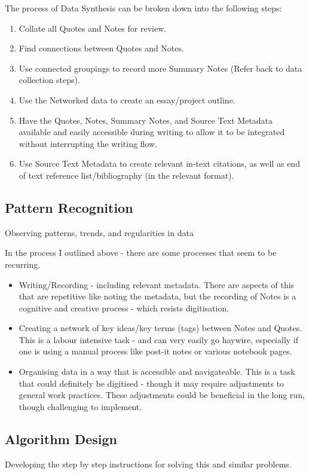 \documentclass{article}
\begin{document}
The process of Data Synthesis can be broken down into the following steps:
\begin{enumerate}
    \item Collate all Quotes and Notes for review.
    \item Find connections between Quotes and Notes.
    \item Use connected groupings to record more Summary Notes (Refer back to data collection steps).
    \item Use the Networked data to create an essay/project outline.
    \item Have the Quotes, Notes, Summary Notes, and Source Text Metadata available and easily accessible during writing to allow it to be integrated without interrupting the writing flow. 
    \item Use Source Text Metadata to create relevant in-text citations, as well as end of text reference list/bibliography (in the relevant format).
\end{enumerate}

\subsection{Pattern Recognition}
Observing patterns, trends, and regularities in data

In the process I outlined above - there are some processes that seem to be recurring. 

\begin{itemize}
    \item Writing/Recording - including relevant metadata. There are aspects of this that are repetitive like noting the metadata, but the recording of Notes is a cognitive and creative process - which resists digitisation. 
    \item Creating a network of key ideas/key terms (tags) between Notes and Quotes. This is a labour intensive task - and can very easily go haywire, especially if one is using a manual process like post-it notes or various notebook pages. 
    \item Organising data in a way that is accessible and navigateable. This is a task that could definitely be digitised - though it may require adjustments to general work practices. These adjustments could be beneficial in the long run, though challenging to implement.
\end{itemize}

\subsection{Algorithm Design}
Developing the step by step instructions for solving this and similar problems.
\end{document}
